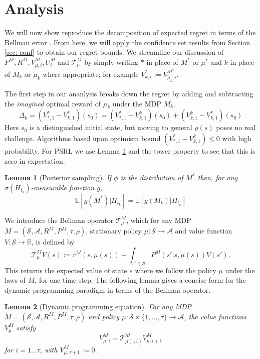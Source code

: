 \documentclass{article}
\newtheorem{lemma}{Lemma}
\newcommand{\Exp}{\mathds{E}}
\newcommand{\Sc}{\mathcal{S}}
\newcommand{\Ac}{\mathcal{A}}
\newcommand{\Tc}{\mathcal{T}}
\begin{document}
\section{Analysis}
We will now show reproduce the decomposition of expected regret in terms of the Bellman error \cite{osband2013more}.
From here, we will apply the confidence set results from Section \ref{sec: conf} to obtain our regret bounds.
We streamline our discussion of $P^{M}, R^{M}, V^{M}_{\mu,i}, U^{M}_{i}$ and $\Tc^M_\mu$ by simply writing $*$ in place of $M^*$ or $\mu^*$ and $k$ in place of $M_k$ or $\mu_k$ where appropriate; for example $V^*_{k,i} := V^{M^*}_{\tilde{\mu}_k,i}$.

The first step in our ananlysis breaks down the regret by adding and subtracting the \emph{imagined} optimal reward of $\mu_k$ under the MDP $M_k$.
\begin{equation}
	\Delta_k = \left( V^*_{*,1} - V^*_{k,1} \right)(s_0)
	= \left( V^*_{*,1} - V^k_{k,1} \right)(s_0) + \left( V^k_{k,1} - V^*_{k,1} \right)(s_0)
\end{equation}
Here $s_0$ is a distinguished initial state, but moving to general $\rho(s)$ poses no real challenge.
Algorithms based upon optimism bound $( V^*_{*,1} - V^k_{k,1} ) \le 0$ with high probability.
For PSRL we use Lemma \ref{lem: ps} and the tower property to see that this is zero in expectation.
\begin{lemma}[Posterior sampling]
\label{lem: ps}
\hspace{0.00000000000001mm} \newline
If $\phi$ is the distribution of $M^*$ then, for any $\sigma(H_{t_k})$-measurable function $g$,
\begin{equation}
\label{eq: ps}
	\Exp [g(M^*) | H_{t_k} ] = \Exp [g(M_k) | H_{t_k} ]
\end{equation}
\end{lemma}

We introduce the Bellman operator $\mathcal{T}_{\mu}^{M}$, which for any MDP $M = (\Sc, \Ac, R^M, P^M, \tau, \rho)$, stationary policy $\mu:\Sc \rightarrow \Ac$ and value function $V:\Sc \rightarrow \mathds{R}$, is defined by
$$\mathcal{T}_{\mu}^{M} V(s) := \overline{r}^{M} (s, \mu(s)) + \int_{s' \in \Sc} P^{M}(s' | s, \mu(s)) V(s').$$
This returns the expected value of state $s$ where we follow the policy $\mu$ under the laws of $M$, for one time step.
The following lemma gives a concise form for the dynamic programming paradigm in terms of the Bellman operator.

\begin{lemma}[Dynamic programming equation]
\label{lem: DPl} \hspace{0.000000001mm} \newline
For any MDP $M = (\Sc, \Ac, R^M, P^M, \tau, \rho)$ and policy $\mu:\Sc \times \{1,\ldots,\tau\} \rightarrow \Ac$, the value functions $V^M_\mu$ satisfy
\begin{equation}\label{eq: DP}
V_{\mu,i}^{M} = \mathcal{T}_{\mu(\cdot,i)}^M V_{\mu,i+1}^M
\end{equation}
for $i=1\dots \tau$, with $V_{\mu,\tau+1}^{M} := 0$.
\end{lemma}
\end{document}
